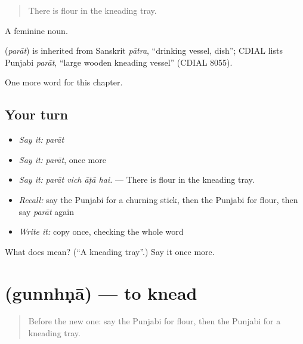 \begin{quote}
There is flour in the kneading tray.
\end{quote}

A feminine noun.

\begin{cousinweb}
\textbf{} (\emph{parāt}) is inherited from Sanskrit \emph{pātra}, \textquotedblleft{}drinking vessel, dish\textquotedblright{}; CDIAL lists Punjabi \emph{parāt}, \textquotedblleft{}large wooden kneading vessel\textquotedblright{} (CDIAL 8055).
\end{cousinweb}

\begin{grammarlens}[title={What you've built}]
One more word for this chapter.
\end{grammarlens}

\subsection*{Your turn}
\begin{itemize}
\raggedright
  \item \emph{Say it:} \emph{parāt}
  \item \emph{Say it:} \emph{parāt}, once more
  \item \emph{Say it:} \emph{parāt vich āṭā hai.} — There is flour in the kneading tray.
  \item \emph{Recall:} say the Punjabi for a churning stick, then the Punjabi for flour, then say \emph{parāt} again
  \item \emph{Write it:} copy \textbf{} once, checking the whole word
\end{itemize}

\begin{tcolorbox}[breakable,colback=teal!4,colframe=teal!35!black,title={Before you move on}]
What does  mean? (\textquotedblleft{}A kneading tray\textquotedblright{}.) Say it once more.
\end{tcolorbox}
\section[\texorpdfstring{\pa{ਗੁੰਨ੍ਹਣਾ} (gunnhṇā)}{ਗੁੰਨ੍ਹਣਾ (gunnhṇā)}]{ (gunnhṇā) — to knead}

\label{lesson:PA-C238-gunnhna}



\begin{quote}
Before the new one: say the Punjabi for flour, then the Punjabi for a kneading tray.
\end{quote}

